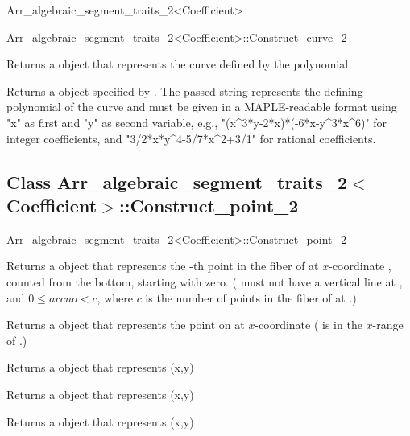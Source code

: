 \begin{ccRefClass}{Arr_algebraic_segment_traits_2<Coefficient>}
\begin{ccClass}{Arr_algebraic_segment_traits_2<Coefficient>::Construct_curve_2}

        {Returns a  object that represents the curve defined by
         the polynomial } 

        {Returns a  object specified by . 
	The passed string represents the defining polynomial of the curve 
	and must be given in a MAPLE-readable format using "x" as first 
	and "y" as second variable, e.g., "(x^3*y-2*x)*(-6*x-y^3*x^6)" 
	for integer coefficients, and "3/2*x*y^4-5/7*x^2+3/1" 
	for rational coefficients.} 


\end{ccClass}

\subsection*{Class 
Arr\_algebraic\_segment\_traits\_2$<$Coefficient$>$::Construct\_point\_2}

\begin{ccClass}{Arr_algebraic_segment_traits_2<Coefficient>::Construct_point_2}


        {Returns a  object that represents the -th
         point in the fiber of  at $x$-coordinate , 
         counted from the bottom, starting with zero.
         \ccPrecond( must not have a vertical line at , 
                    and $0\leq arcno < c$, where $c$ is the number of points 
                     in the fiber of  at .)} 

        {Returns a  object that represents the 
         point on  at $x$-coordinate  
         \ccPrecond( is in the $x$-range of .)}

        {Returns a  object that represents (x,y)} 

        {Returns a  object that represents (x,y)} 

        {Returns a  object that represents (x,y)} 


\end{ccClass}
\end{ccRefClass}
